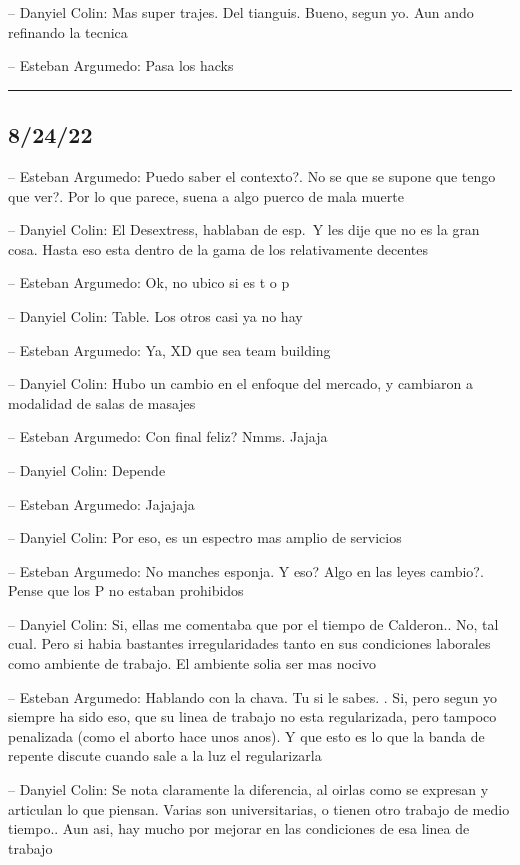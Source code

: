 -- Danyiel Colin: Mas super trajes. Del tianguis. Bueno, segun yo. Aun
ando refinando la tecnica

-- Esteban Argumedo: Pasa los hacks

\begin{center}\rule{0.5\linewidth}{0.5pt}\end{center}

\hypertarget{section-149}{%
\subsection{8/24/22}\label{section-149}}

-- Esteban Argumedo: Puedo saber el contexto?. No se que se supone que
tengo que ver?. Por lo que parece, suena a algo puerco de mala muerte

-- Danyiel Colin: El Desextress, hablaban de esp.~Y les dije que no es
la gran cosa. Hasta eso esta dentro de la gama de los relativamente
decentes

-- Esteban Argumedo: Ok, no ubico si es t o p

-- Danyiel Colin: Table. Los otros casi ya no hay

-- Esteban Argumedo: Ya, XD que sea team building

-- Danyiel Colin: Hubo un cambio en el enfoque del mercado, y cambiaron
a modalidad de salas de masajes

-- Esteban Argumedo: Con final feliz? Nmms. Jajaja

-- Danyiel Colin: Depende

-- Esteban Argumedo: Jajajaja

-- Danyiel Colin: Por eso, es un espectro mas amplio de servicios

-- Esteban Argumedo: No manches esponja. Y eso? Algo en las leyes
cambio?. Pense que los P no estaban prohibidos

-- Danyiel Colin: Si, ellas me comentaba que por el tiempo de Calderon..
No, tal cual. Pero si habia bastantes irregularidades tanto en sus
condiciones laborales como ambiente de trabajo. El ambiente solia ser
mas nocivo

-- Esteban Argumedo: Hablando con la chava. Tu si le sabes. . Si, pero
segun yo siempre ha sido eso, que su linea de trabajo no esta
regularizada, pero tampoco penalizada (como el aborto hace unos anos). Y
que esto es lo que la banda de repente discute cuando sale a la luz el
regularizarla

-- Danyiel Colin: Se nota claramente la diferencia, al oirlas como se
expresan y articulan lo que piensan. Varias son universitarias, o tienen
otro trabajo de medio tiempo.. Aun asi, hay mucho por mejorar en las
condiciones de esa linea de trabajo

